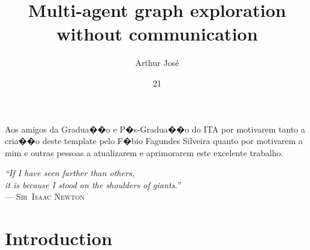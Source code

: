 \documentclass[tg, eng]{ita}    %
\author{Arthur Jos\'{e}}{de Sousa Rodrigues}
\title{Multi-agent graph exploration without communication}
\date{21}{May}{2023}
\begin{document}
\maketitle

\begin{itadedication}
Aos amigos da Gradua��o e P�s-Gradua��o do ITA por motivarem tanto a cria��o deste template pelo F�bio Fagundes Silveira quanto por motivarem a mim e outras pessoas a atualizarem e aprimorarem este excelente trabalho.
\end{itadedication}

\begin{itathanks}

\end{itathanks}

\thispagestyle{empty}
\ifhyperref{}\fi
\begin{flushright}
\begin{spacing}{1}
\mbox{}\vfill
{\sffamily\itshape
``If I have seen farther than others,\\
it is because I stood on the shoulders of giants.''\\}
--- \textsc{Sir~Isaac Newton}
\end{spacing}
\end{flushright}

\begin{abstract}
\noindent

\end{abstract}

\begin{englishabstract}
\noindent

\end{englishabstract}

\listoffigures %

\listoftables %

\listofabbreviations

\listofsymbols

\tableofcontents

\mainmatter

\chapter{Introduction}

\end{document}

